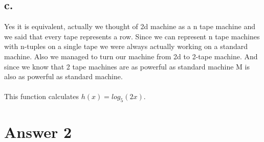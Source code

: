 \documentclass[12pt]{article}
\begin{document}
{{\subsection*{c.}
Yes it is equivalent, actually we thought of 2d machine as a n tape machine and we said that every tape represents a row. Since we can represent n tape machines with n-tuples on a single tape we were always actually working on a standard machine. Also we managed to turn our machine from 2d to 2-tape machine. And since we know that 2 tape machines are as powerful as standard machine M is also as powerful as standard machine.\\
\\
This function calculates $h(x)=log_5(2x)$.
\section*{Answer 2}

}}
\end{document}
